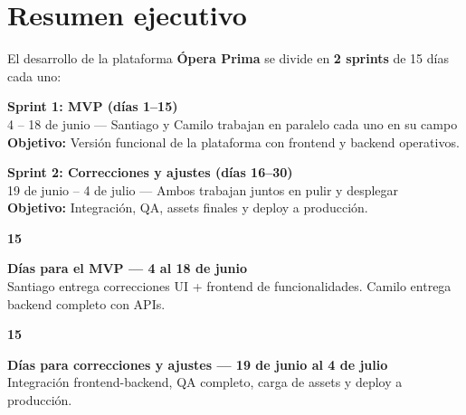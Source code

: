 \documentclass[11pt]{article}
\begin{document}
\newpage

\section{Resumen ejecutivo}

El desarrollo de la plataforma \textbf{Ópera Prima} se divide en \textbf{2 sprints} de 15 días cada uno:

\medskip

\begin{tcolorbox}[op-mvp]
  \centering
  {\Large\bfseries\color{op-verde} Sprint 1: MVP (días 1--15)}\\[2pt]
  {\color{op-textsec} 4 -- 18 de junio --- Santiago y Camilo trabajan en paralelo cada uno en su campo}\\[4pt]
  {\bfseries\color{op-nearblack} Objetivo:} Versión funcional de la plataforma con frontend y backend operativos.
\end{tcolorbox}

\medskip

\begin{tcolorbox}[op-aviso]
  \centering
  {\Large\bfseries\color{op-rosa-dark} Sprint 2: Correcciones y ajustes (días 16--30)}\\[2pt]
  {\color{op-textsec} 19 de junio -- 4 de julio --- Ambos trabajan juntos en pulir y desplegar}\\[4pt]
  {\bfseries\color{op-nearblack} Objetivo:} Integración, QA, assets finales y deploy a producción.
\end{tcolorbox}

\medskip

\begin{tcolorbox}[op-box]
  \begin{minipage}[c]{0.12\textwidth}
    \centering
    \Huge\bfseries\color{op-verde} 15
  \end{minipage}
  \hfill
  \begin{minipage}[c]{0.82\textwidth}
    {\large\bfseries\color{op-nearblack} Días para el MVP --- 4 al 18 de junio}\\[2pt]
    {\color{op-textsec} Santiago entrega correcciones UI + frontend de funcionalidades. Camilo entrega backend completo con APIs.}
  \end{minipage}
\end{tcolorbox}

\medskip

\begin{tcolorbox}[op-box]
  \begin{minipage}[c]{0.12\textwidth}
    \centering
    \Huge\bfseries\color{op-rosa} 15
  \end{minipage}
  \hfill
  \begin{minipage}[c]{0.82\textwidth}
    {\large\bfseries\color{op-nearblack} Días para correcciones y ajustes --- 19 de junio al 4 de julio}\\[2pt]
    {\color{op-textsec} Integración frontend-backend, QA completo, carga de assets y deploy a producción.}
  \end{minipage}
\end{tcolorbox}
\end{document}
